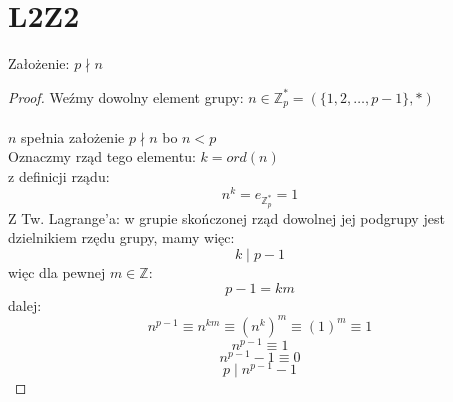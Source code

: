 \documentclass{article}
\title{}
\date{20.10.2020}
\author{Maurycy Borkowski}
\begin{document}
\maketitle

\section{L2Z2}
Założenie: $p \nmid n$\\
\begin{proof}
Weźmy dowolny element grupy: $n \in \mathbb{Z}_p^* = (\{1,2,\dots,p-1\},*)$\\\\
$n$ spełnia założenie $p \nmid n$ bo $n < p$\\
Oznaczmy rząd tego elementu: $k = ord(n)$\\
z definicji rządu:
$$
n^{k} = e_{\mathbb{Z}_p^*} = 1
$$
Z Tw. Lagrange'a: w grupie skończonej rząd dowolnej jej podgrupy jest dzielnikiem rzędu grupy, mamy więc:
$$
k \mid p-1
$$
więc dla pewnej $m \in \mathbb{Z}$:
$$
p-1 = km
$$
dalej:
$$
n^{p-1}  \equiv n^{km}  \equiv(n^k)^m  \equiv(1)^m \equiv 1
$$
$$
n^{p-1} \equiv 1
$$
$$
n^{p-1} - 1 \equiv 0
$$
$$
p \mid n^{p-1}-1
$$
\end{proof}
\end{document}
